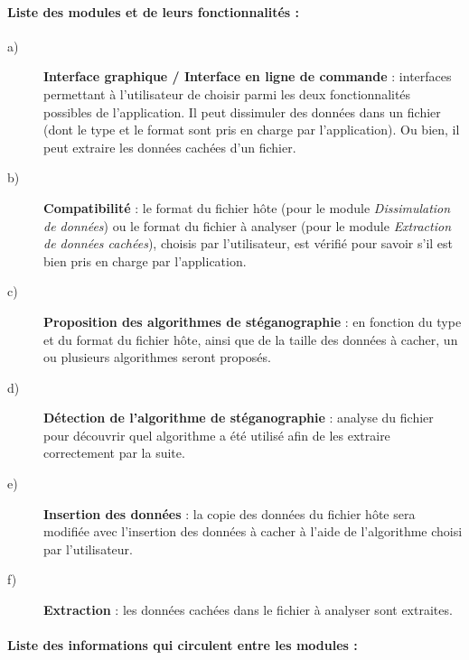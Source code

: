\documentclass[11pt]{article}
\begin{document}
\paragraph{Liste des modules et de leurs fonctionnalités :}

\begin{description}

\item[a)] \textbf{Interface graphique / Interface en ligne de commande} :
    interfaces permettant à l'utilisateur de choisir parmi les deux
    fonctionnalités possibles de l'application. Il peut dissimuler des
    données dans un fichier (dont le type et le format sont pris en charge
    par l'application). Ou bien, il peut extraire les données cachées d'un
    fichier. 

\item[b)] \textbf{Compatibilité} : le format du fichier hôte (pour le module
    \textit{Dissimulation de données}) ou le format du fichier à analyser (pour
    le module \textit{Extraction de données cachées}), choisis par
    l'utilisateur, est vérifié pour savoir s'il est bien pris en charge
    par l'application. 

\item[c)] \textbf{Proposition des algorithmes de stéganographie} : en fonction
    du type et du format du fichier hôte, ainsi que de la taille des données à
    cacher, un ou plusieurs algorithmes seront proposés. 

\item[d)] \textbf{Détection de l'algorithme de stéganographie} : analyse du
    fichier pour découvrir quel algorithme a été utilisé afin de les extraire
    correctement par la suite. 

\item[e)] \textbf{Insertion des données} : la copie des données du fichier hôte
    sera modifiée avec l'insertion des données à cacher à l'aide de l'algorithme
    choisi par l'utilisateur. 

\item[f)] \textbf{Extraction} : les données cachées dans le fichier à analyser
    sont extraites. 

\end{description}

\paragraph{Liste des informations qui circulent entre les modules :}
\end{document}
